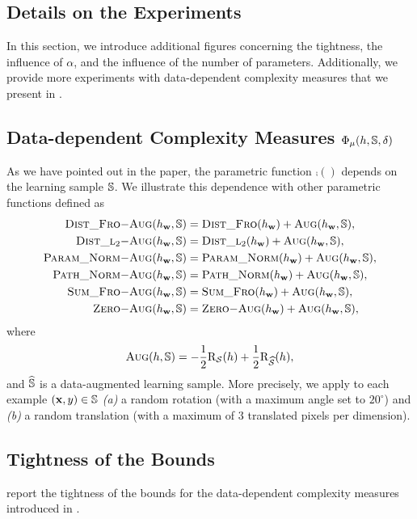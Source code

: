 \begin{noaddcontents}
\section{Details on the Experiments}

In this section, we introduce additional figures concerning the tightness, the influence of $\alpha$, and the influence of the number of parameters.
Additionally, we provide more experiments with data-dependent complexity measures that we present in .

\subsection{Data-dependent Complexity Measures $\PhiComp(\h,\S,\delta)$}
\label{ap:dis-mu:data-dependent-comp}

As we have pointed out in the paper, the parametric function $\comp()$ depends on the learning sample $\S$. 
We illustrate this dependence with other parametric functions defined as
\begin{align*}
  \distfroaug(\h_\wbf, \S) &= \distfro(\h_\wbf)+\aug(\h_\wbf, \S),\\
  \distltwoaug(\h_\wbf, \S) &= \distltwo(\h_\wbf)+\aug(\h_\wbf, \S),\\
  \paramnormaug(\h_\wbf, \S) &= \paramnorm(\h_\wbf)+\aug(\h_\wbf, \S),\\
  \pathnormaug(\h_\wbf, \S) &= \pathnorm(\h_\wbf)+\aug(\h_\wbf, \S),\\
  \sumfroaug(\h_\wbf, \S) &= \sumfro(\h_\wbf)+\aug(\h_\wbf, \S),\\
  \zeroaug(\h_\wbf, \S) &= \zeroaug(\h_\wbf)+\aug(\h_\wbf, \S),
\end{align*}
where 
\begin{align*}
    \aug(\h, \S) = -\frac{1}{2}\Risk_{\dS}(\h)+\frac{1}{2}\Risk_{\dSpert}(\h),
\end{align*}
and $\Spert$ is a data-augmented learning sample. 
More precisely, we apply to each example $(\x,\y)\in\S$ {\it (a)} a random rotation (with a maximum angle set to $20^{\circ}$) and {\it (b)} a random translation (with a maximum of $3$ translated pixels per dimension).

\subsection{Tightness of the Bounds}

 report the tightness of the bounds for the data-dependent complexity measures introduced in .


\end{noaddcontents}
